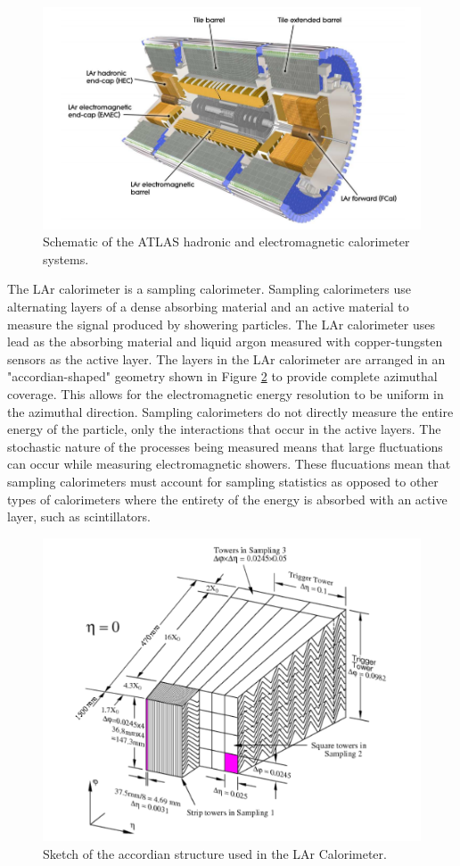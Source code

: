 \begin{figure}[h!]
	\centering
	\includegraphics[width=\columnwidth]{../ThesisImages/LHCImages/ATLASCaloSystem.png}
	\caption[Schematic of the ATLAS hadronic and electromagnetic calorimeter systems.]{Schematic of the ATLAS hadronic and electromagnetic calorimeter systems.\cite{ATLAS}
	}
	\label{fig:ATLASCaloSys}
\end{figure}

The LAr calorimeter is a sampling calorimeter.  Sampling calorimeters use alternating layers of a dense absorbing material and an active material to measure the signal produced by showering particles.  The LAr calorimeter uses lead as the absorbing material and liquid argon measured with copper-tungsten sensors as the active layer.  The layers in the LAr calorimeter are arranged in an "accordian-shaped" geometry shown in Figure \ref{fig:LArAccordian} to provide complete azimuthal coverage.  This allows for the electromagnetic energy resolution to be uniform in the azimuthal direction.  Sampling calorimeters do not directly measure the entire energy of the particle, only the interactions that occur in the active layers. The stochastic nature of the processes being measured means that large fluctuations can occur while measuring electromagnetic showers.  These flucuations mean that sampling calorimeters must account for sampling statistics as opposed to other types of calorimeters where the entirety of the energy is absorbed with an active layer, such as scintillators.  
\begin{figure}[h!]
	\centering
	\includegraphics[width=0.5\columnwidth]{../ThesisImages/LHCImages/LArAccordian.png}
	\caption[Sketch of the accordian structure used in the LAr Calorimeter]{Sketch of the accordian structure used in the LAr Calorimeter.\cite{CERN-LHCC-96-041}
	}
	\label{fig:LArAccordian}
\end{figure}

